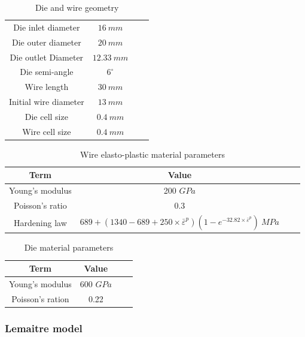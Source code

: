 \documentclass[sn-mathphys,Numbered,draft]{sn-jnl}%
\begin{document}
\begin{table}[htb]
	\centering
		\begin{tabular}{cccc} \hline
		    Die inlet diameter & $16\ mm$ \\
		    Die outer diameter & $20\ mm$ \\
      	Die outlet Diameter & $12.33\ mm$ \\
            Die semi-angle &  $6^{\circ}$ \\
		    Wire length & $30\ mm$ \\
		    Initial wire diameter & $13\ mm$ \\
      	Die cell size & $0.4\ mm$ \\
            Wire cell size & $0.4\ mm$ \\
			\hline
		\end{tabular}
	\caption{Die and wire geometry}
	\label{tab:material_properties}
\end{table}


\begin{table}[htb]
	\centering
		\begin{tabular}{cccc} \hline
			Term  & Value  \\ \hline 
            Young's modulus & 200 $GPa$ \\
			Poisson's ratio & 0.3  \\
   		Hardening law & $689+(1340-689+250\times\bar{\varepsilon}^p)(1-e^{-32.82\times\bar{\varepsilon}^p})\ MPa$ &  \\
			\hline
		\end{tabular}
	\caption{Wire elasto-plastic material parameters}
	\label{tab:material_properties}
\end{table}

\begin{table}[htb]
	\centering
		\begin{tabular}{cccc} \hline
			Term  & Value  \\ \hline 
            Young's modulus & 600 $GPa$ \\
			Poisson's ration & 0.22  \\
			\hline
		\end{tabular}
	\caption{Die material parameters}
	\label{tab:material_properties}
\end{table}


\FloatBarrier

\subsubsection{Lemaitre model}
\end{document}
